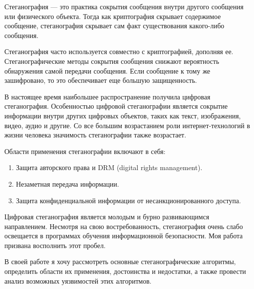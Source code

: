 \Introduction
Стеганография --- это практика сокрытия сообщения внутри другого сообщения или физического объекта.
Тогда как криптография скрывает содержимое сообщение, стеганография скрывает сам факт существования какого-либо сообщения. 

Стеганография часто используется совместно с криптографией, дополняя ее.
Стеганографические методы сокрытия сообщения снижают вероятность обнаружения самой передачи сообщения.
Если сообщение к тому же зашифровано, то это обеспечивает еще большую защищенность. 

В настоящее время наибольшее распространение получила цифровая стеганография.
Особенностью цифровой стеганографии является сокрытие информации внутри других цифровых объектов,
таких как текст, изображения, видео, аудио и другие.
Со все большим возрастанием роли интернет-технологий в жизни человека значимость стеганографии также возрастает.

Области применения стеганографии включают в себя:
\begin{enumerate}
    \item Защита авторского права и DRM (digital rights management).
    \item Незаметная передача информации.
    \item Защита конфиденциальной информации от несанкционированного доступа.
\end{enumerate}

Цифровая стеганография является молодым и бурно развивающимся направлением.
Несмотря на свою востребованность, стеганография очень слабо освещается в программах обучения информационной безопасности.
Моя работа призвана восполнить этот пробел.

В своей работе я хочу рассмотреть основные стеганографические алгоритмы, определить области их применения,
достоинства и недостатки, а также провести анализ возможных уязвимостей этих алгоритмов.
